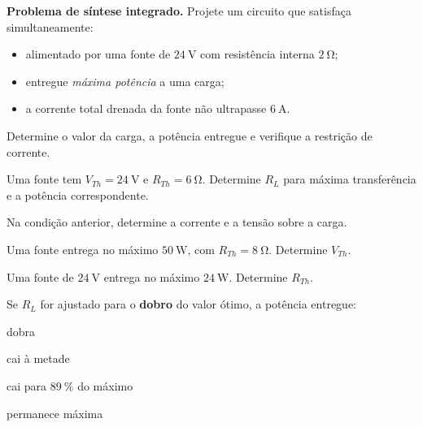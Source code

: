 \blocodesafio
\begin{questao}[4]{}

\textbf{Problema de síntese integrado.} Projete um circuito que satisfaça
simultaneamente:
\begin{itemize}[leftmargin=1.6em,itemsep=1pt,topsep=2pt]
\item alimentado por uma fonte de $\SI{24}{\volt}$ com resistência interna
      $\SI{2}{\ohm}$;
\item entregue \emph{máxima potência} a uma carga;
\item a corrente total drenada da fonte não ultrapasse $\SI{6}{\ampere}$.
\end{itemize}
Determine o valor da carga, a potência entregue e verifique a restrição de
corrente.


\end{questao}

\blocofixacao
\begin{questao}[1]{}

Uma fonte tem $V_{Th}=\SI{24}{\volt}$ e $R_{Th}=\SI{6}{\ohm}$. Determine
$R_L$ para máxima transferência e a potência correspondente.


\end{questao}
\begin{questao}[1]{}

Na condição anterior, determine a corrente e a tensão sobre a carga.


\end{questao}
\begin{questao}[1]{}

Uma fonte entrega no máximo $\SI{50}{\watt}$, com $R_{Th}=\SI{8}{\ohm}$.
Determine $V_{Th}$.


\end{questao}
\begin{questao}[1]{}

Uma fonte de $\SI{24}{\volt}$ entrega no máximo $\SI{24}{\watt}$. Determine
$R_{Th}$.


\end{questao}
\begin{questao}[1]{}

Se $R_L$ for ajustado para o \textbf{dobro} do valor ótimo, a potência
entregue:
\begin{alternativas}[2]
\item dobra
\item cai à metade
\item cai para $\SI{89}{\percent}$ do máximo
\item permanece máxima
\end{alternativas}


\end{questao}

